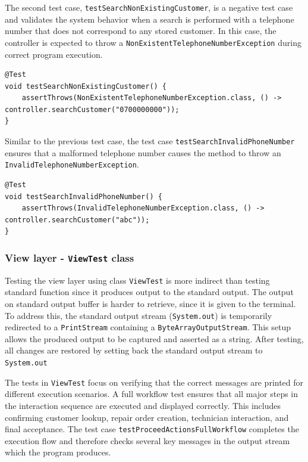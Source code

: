 \documentclass[a4paper]{scrartcl}
\begin{document}
The second test case, \texttt{testSearchNonExistingCustomer}, is a negative test case and validates the system behavior when a search is performed with a telephone number that does not correspond to any stored customer. In this case, the controller is expected to throw a \texttt{NonExistentTelephoneNumberException} during correct program execution.

\begin{lstlisting}[style=javastyle, caption={Negative test for searching a non-existing customer in \texttt{ReceptionistControllerTest}}]
@Test
void testSearchNonExistingCustomer() {
    assertThrows(NonExistentTelephoneNumberException.class, () -> controller.searchCustomer("0700000000"));
}
\end{lstlisting}

Similar to the previous test case, the test case \texttt{testSearchInvalidPhoneNumber} ensures that a malformed telephone number causes the method to throw an \texttt{InvalidTelephoneNumberException}.

\begin{lstlisting}[style=javastyle, caption={Negative test for searching with an invalid telephone number in \texttt{ReceptionistControllerTest}}]
@Test
void testSearchInvalidPhoneNumber() {
    assertThrows(InvalidTelephoneNumberException.class, () -> controller.searchCustomer("abc"));
}
\end{lstlisting}

\subsubsection{View layer - \texttt{ViewTest} class}

Testing the view layer using class \texttt{ViewTest} is more indirect than testing standard function since it produces output to the standard output. The output on standard output buffer is harder to retrieve, since it is given to the terminal. To address this, the standard output stream (\texttt{System.out}) is temporarily redirected to a \texttt{PrintStream} containing a \texttt{ByteArrayOutputStream}. This setup allows the produced output to be captured and asserted as a string. After testing, all changes are restored by setting back the standard output stream to \texttt{System.out}

The tests in \texttt{ViewTest} focus on verifying that the correct messages are printed for different execution scenarios. A full workflow test ensures that all major steps in the interaction sequence are executed and displayed correctly. This includes confirming customer lookup, repair order creation, technician interaction, and final acceptance. The test case \texttt{testProceedActionsFullWorkflow} completes the execution flow and therefore checks several key messages in the output stream which the program produces.
\end{document}
